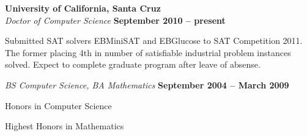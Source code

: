 \documentclass[margin,line]{resume}
\begin{document}
\begin{resume}
    \textbf{University of California, Santa Cruz} \vspace{2mm}\\\vspace{1mm}%
    \textsl{Doctor of Computer Science} \hfill \textbf{ September 2010 -- present}\vspace{-3mm}\\\vspace{-1mm}%
    \begin{mylist}
        \item Submitted SAT solvers EBMiniSAT and EBGlucose to SAT Competition 2011.
            The former placing 4th in number of satisfiable industrial problem instances solved.
            Expect to complete graduate program after leave of absense.
    \end{mylist}\vspace{-1.5mm}
    \textsl{BS Computer Science, BA Mathematics} \hfill \textbf{September 2004 -- March 2009}\vspace{-3mm}\\\vspace{-1mm}%
    \begin{mylist}
        \item Honors in Computer Science
        \item Highest Honors in Mathematics
    \end{mylist}


%


\end{resume}
\end{document}
